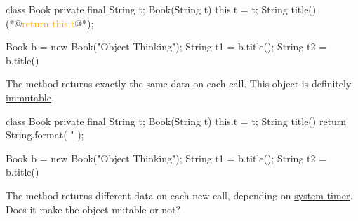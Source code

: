 \documentclass{article}
\begin{document}

\begin{pptWide}{2}
{\small\begin{ffcode}
class Book {
  private final String t;
  Book(String t) { this.t = t; }
  String title() {
    (*@\textcolor{orange}{return this.t}@*);
  }
}
\end{ffcode}
}
\par\columnbreak\par
{\small\begin{ffcode}
Book b = new Book("Object Thinking");
String t1 = b.title();
String t2 = b.title()
\end{ffcode}
}
\par
The  method returns exactly the same data on each call.
This object is definitely \ul{immutable}.
\end{pptWide}
\par
\plush{}

\begin{pptWide}{2}
{\small\begin{ffcode}
class Book {
  private final String t;
  Book(String t) { this.t = t; }
  String title() {
    return String.format(
      "%
    );
  }
}
\end{ffcode}
}
\par\columnbreak\par
{\small\begin{ffcode}
Book b = new Book("Object Thinking");
String t1 = b.title();
String t2 = b.title()
\end{ffcode}
}
\par
The  method returns different data on each new call,
depending on \ul{system timer}.
Does it make the object mutable or not?
\end{pptWide}
\par
\plush{}
\end{document}
